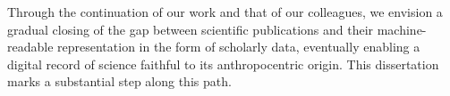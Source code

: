 \vspace{1em}Through the continuation of our work and that of our colleagues,
we envision a gradual closing of the gap between scientific publications and their machine-readable representation in the form of scholarly data, eventually enabling a digital record of science faithful to its anthropocentric origin.
This dissertation marks a substantial step along this path.
